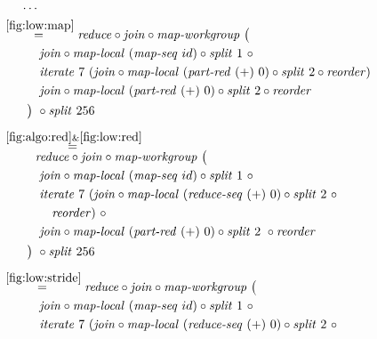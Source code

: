 \begin{figure*}[t]
\begin{align*}
  &\hspace{.5em}\ldots\\
%
  &\hspace{-2em}\quad\begin{aligned}
    &\overset{\ref{fig:low:map}}{=\hspace{.2em}}
      \reduce \circ \join \circ \mapWorkgroup\ \big(\\
    &\qquad\quad\join \circ \mapLocal\ (\mapSeq\ id) \circ \splitN\ 1\ \circ\\
    &\qquad\quad\iterateN\ 7\ (\join \circ \mapLocal\ (\partRed\ (+)\ 0) \circ \splitN\ 2\circ \reorder)\\
    &\qquad\quad\join \circ \mapLocal\ (\partRed\ (+)\ 0) \circ \splitN\ 2\circ \reorder\\
    &\qquad\big)\ \circ \splitN\ 256
  \end{aligned}\\[.5em]
%
  &\hspace{-2em}\quad\begin{aligned}
    &\overset{\ref{fig:algo:red}\&\ref{fig:low:red}}{=\hspace{.2em}}\\[-.75em]
    &\qquad\ \ 
      \reduce \circ \join \circ \mapWorkgroup\ \big(\\
    &\qquad\quad\join \circ \mapLocal\ (\mapSeq\ id) \circ \splitN\ 1\ \circ\\
    &\qquad\quad\iterateN\ 7\ (\join \circ \mapLocal\ (\reduceSeq\ (+)\ 0) \circ \splitN\ 2\ \circ\\
    &\qquad\qquad \reorder)\ \circ\\
    &\qquad\quad\join \circ \mapLocal\ (\partRed\ (+)\ 0) \circ \splitN\ 2\ \circ \reorder\\
    &\qquad\big)\ \circ \splitN\ 256
  \end{aligned}\\[.5em]
%
  &\hspace{-2em}\quad\begin{aligned}
    &\overset{\ref{fig:low:stride}}{=\hspace{.2em}}
      \reduce \circ \join \circ \mapWorkgroup\ \big(\\
    &\qquad\quad\join \circ \mapLocal\ (\mapSeq\ id) \circ \splitN\ 1\ \circ\\
    &\qquad\quad\iterateN\ 7\ (\join \circ \mapLocal\ (\reduceSeq\ (+)\ 0) \circ \splitN\ 2\ \circ\\

\end{aligned}
\end{align*}
\end{figure*}
